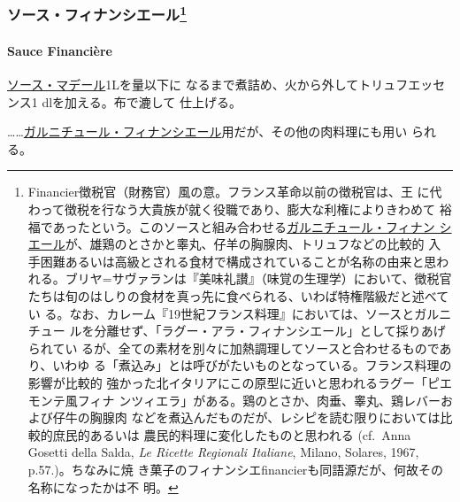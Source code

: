 \begin{recette}
{\subsubsection[ソース・フィナンシエール]{\texorpdfstring{ソース・フィナンシエール\footnote{Financier徴税官（財務官）風の意。フランス革命以前の徴税官は、王
  に代わって徴税を行なう大貴族が就く役職であり、膨大な利権によりきわめて
  裕福であったという。このソースと組み合わせる\protect\hyperlink{}{ガルニチュール・フィナン
  シエール}が、雄鶏のとさかと睾丸、仔羊の胸腺肉、トリュフなどの比較的
  入手困難あるいは高級とされる食材で構成されていることが名称の由来と思わ
  れる。ブリヤ=サヴァランは『美味礼讃』（味覚の生理学）において、徴税官
  たちは旬のはしりの食材を真っ先に食べられる、いわば特権階級だと述べてい
  る。なお、カレーム『19世紀フランス料理』においては、ソースとガルニチュー
  ルを分離せず、「ラグー・アラ・フィナンシエール」として採りあげられてい
  るが、全ての素材を別々に加熱調理してソースと合わせるものであり、いわゆ
  る「煮込み」とは呼びがたいものとなっている。フランス料理の影響が比較的
  強かった北イタリアにこの原型に近いと思われるラグー「ピエモンテ風フィナ
  ンツィエラ」がある。鶏のとさか、肉垂、睾丸、鶏レバーおよび仔牛の胸腺肉
  などを煮込んだものだが、レシピを読む限りにおいては比較的庶民的あるいは
  農民的料理に変化したものと思われる (cf.~Anna Gosetti della Salda,
  \emph{Le Ricette Regionali Italiane}, Milano, Solares, 1967,
  p.57.)。ちなみに焼
  き菓子のフィナンシエfinancierも同語源だが、何故その名称になったかは不
  明。}}{ソース・フィナンシエール}}\label{ux30bdux30fcux30b9ux30d5ux30a3ux30caux30f3ux30b7ux30a8ux30fcux30eb34}}

\hypertarget{sauce-financiere}{%
\paragraph{Sauce Financière}\label{sauce-financiere}}

  

\protect\hyperlink{sauce-madere}{ソース・マデール}1\unquart{}Lを\troisquarts{}量以下に
なるまで煮詰め、火から外してトリュフエッセンス1 dlを加える。布で漉して
仕上げる。

\ldots{}\ldots{}\protect\hyperlink{}{ガルニチュール・フィナンシエール}用だが、その他の肉料理にも用い
られる。


\end{recette}
